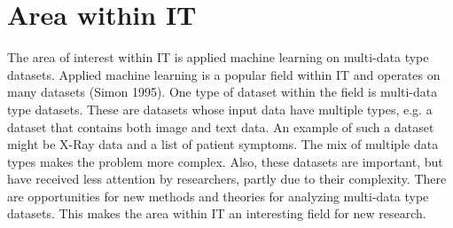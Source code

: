 \chapter{Area within IT}

The area of interest within IT is applied machine learning on multi-data type datasets.  Applied machine learning is a popular field within IT and operates on many datasets (Simon 1995).  One type of dataset within the field is multi-data type datasets.  These are datasets whose input data have multiple types, e.g. a dataset that contains both image and text data.  An example of such a dataset might be X-Ray data and a list of patient symptoms.  The mix of multiple data types makes the problem more complex.  Also, these datasets are important, but have received less attention by researchers, partly due to their complexity.  There are opportunities for new methods and theories for analyzing multi-data type datasets.  This makes the area within IT an interesting field for new research.








